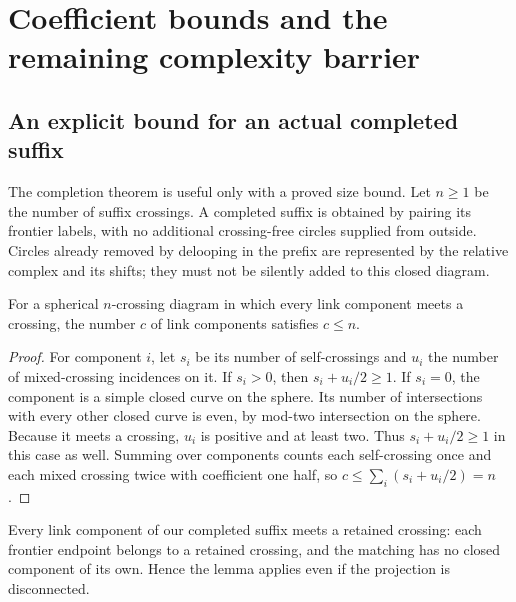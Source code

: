 \section{Coefficient bounds and the remaining complexity barrier}
\label{sec:complexity}

\subsection{An explicit bound for an actual completed suffix}

The completion theorem is useful only with a proved size bound. Let $n\ge1$
be the number of suffix crossings. A completed suffix is obtained by pairing
its frontier labels, with no additional crossing-free circles supplied from
outside. Circles already removed by delooping in the prefix are represented by
the relative complex and its shifts; they must not be silently added to this
closed diagram.

\begin{lemma}
\label{lem:components-crossings}
For a spherical $n$-crossing diagram in which every link component meets a
crossing, the number $c$ of link components satisfies $c\le n$.
\end{lemma}
\begin{proof}
For component $i$, let $s_i$ be its number of self-crossings and $u_i$ the number
of mixed-crossing incidences on it. If $s_i>0$, then $s_i+u_i/2\ge1$.
If $s_i=0$, the component is a simple closed curve on the sphere. Its number of
intersections with every other closed curve is even, by mod-two intersection
on the sphere. Because it meets a crossing, $u_i$ is positive and at least two.
Thus $s_i+u_i/2\ge1$ in this case as well. Summing over components counts
each self-crossing once and each mixed crossing twice with coefficient one
half, so $c\le\sum_i(s_i+u_i/2)=n$.
\end{proof}

Every link component of our completed suffix meets a retained crossing:
each frontier endpoint belongs to a retained crossing, and the matching has
no closed component of its own. Hence the lemma applies even if the projection
is disconnected.

